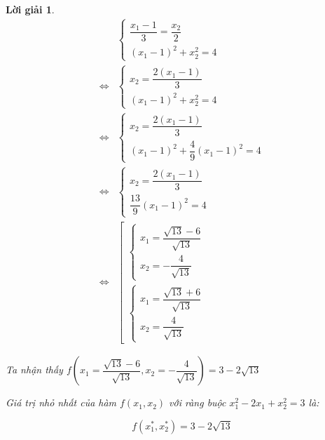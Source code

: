 \documentclass[14pt, a4paper]{article}
\theoremstyle{sltheorem}
\theoremstyle{soltheorem}
\newtheorem*{loigiai}{Lời giải}
\begin{document}
\begin{loigiai}
        \begin{equation*}
            \begin{aligned}
                &\begin{cases}
                    \dfrac{x_1 - 1}{3} = \dfrac{x_2}{2} \\
                    (x_1 - 1)^2 + x_2^2 = 4
                \end{cases} \\
                \Leftrightarrow & \begin{cases}
                    x_2 = \dfrac{2(x_1 - 1)}{3} \\
                    (x_1 - 1)^2 + x_2^2 = 4
                \end{cases} \\
                \Leftrightarrow & \begin{cases}
                    x_2 = \dfrac{2(x_1 - 1)}{3} \\
                    (x_1 - 1)^2 + \dfrac{4}{9}(x_1 - 1)^2 = 4
                \end{cases} \\
                \Leftrightarrow & \begin{cases}
                    x_2 = \dfrac{2(x_1 - 1)}{3} \\
                    \dfrac{13}{9}(x_1 - 1)^2 = 4
                \end{cases} \\
                \Leftrightarrow & \left [\begin{array}{l} \begin{cases} x_1 = \dfrac{\sqrt{13} - 6}{\sqrt{13}} \\ x_2 = -\dfrac{4}{\sqrt{13}} \end{cases} \\ \begin{cases} x_1 = \dfrac{\sqrt{13} + 6}{\sqrt{13}} \\ x_2 = \dfrac{4}{\sqrt{13}} \end{cases} \end{array} \right.
            \end{aligned}
        \end{equation*}

        Ta nhận thấy $f(x_1=\dfrac{\sqrt{13} - 6}{\sqrt{13}}, x_2 = -\dfrac{4}{\sqrt{13}})=3 - 2\sqrt{13}$

        Giá trị nhỏ nhất của hàm $f(x_1, x_2)$ với ràng buộc $x_1^2 - 2x_1 + x_2^2 = 3$ là:

        \begin{equation*}
            f(x_1^*, x_2^*) = 3 - 2\sqrt{13}
        \end{equation*}


\end{loigiai}
\end{document}
